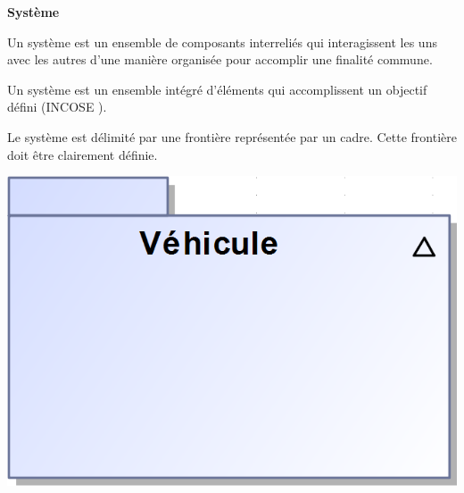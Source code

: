 \documentclass[11pt,oneside]{article}
\begin{document}
\begin{defi}
\textbf{Système \cite{roques}}

\begin{minipage}[c]{.75\textwidth}
Un système est un ensemble de composants interreliés qui interagissent les uns avec les autres d’une manière organisée pour accomplir une finalité commune.%

Un système est un ensemble intégré d’éléments qui accomplissent un objectif défini (INCOSE ).

Le système est délimité par une frontière représentée par un cadre. Cette frontière doit être clairement définie.
\end{minipage}\hfill
\begin{minipage}[c]{.2\textwidth}
\begin{center}
\includegraphics[width=.9\textwidth]{png/frontiere}
\end{center}
\end{minipage}
\end{defi}
\end{document}
